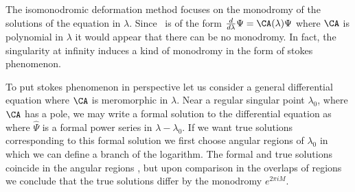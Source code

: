 
The isomonodromic deformation method focuses on the monodromy
of the solutions of the equation in $\lambda$. Since 
\laxii\linsys\ is of the form
${d\over d\lambda}\Psi=\CA(\lambda)\Psi$ where $\CA$ is polynomial
in $\lambda$ 
it would appear that there can be no monodromy. In fact, the 
singularity at infinity induces a kind of monodromy in the 
form of stokes phenomenon.

To put stokes phenomenon in perspective let us consider a general
differential equation 
\eqn{}
where $\CA$ is meromorphic in $\lambda$. 
Near a 
regular singular point $\lambda_0$, where $\CA$ has a pole,
we may write a formal solution to the differential equation as
\eqn{}
where $\hat\Psi$ is a formal power series in $\lambda-\lambda_0$.
If we want true solutions corresponding to this formal solution
we first choose angular regions of $\lambda_0$ in which we can 
define a branch of the logarithm. 
The formal and true solutions coincide 
in the angular regions
 ,
but upon comparison in the overlaps 
of regions we conclude that the true solutions differ by
the monodromy $e^{2\pi iM}$. 

